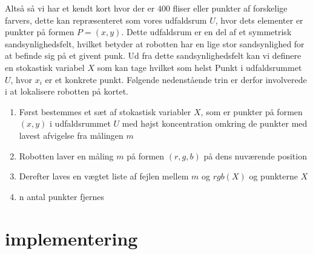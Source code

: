 \documentclass[../../SRP.tex]{subfiles}
\begin{document}

\begin{center}
\end{center}

Altså så vi har et kendt kort hvor der er $400$ fliser eller punkter af forskelige farvers, dette kan repræsenteret som vores udfaldsrum $U$, hvor dets elementer er punkter på formen $P = (x,y)$. Dette udfaldsrum er en del af et symmetrisk sandsynlighedsfelt, hvilket betyder at robotten har en lige stor sandsynlighed for at befinde sig på et givent punk. Ud fra dette sandsynlighedsfelt kan vi definere en stokastisk variabel $X$ som kan tage hvilket som helst Punkt i udfaldsrummet $U$, hvor $x_i$ er et konkrete punkt. Følgende nedenstående trin er derfor involverede i at lokalisere robotten på kortet.

\begin{enumerate}
  \item Først bestemmes et sæt af stokastisk variabler $X$, som er punkter på formen $(x,y)$ i udfaldsrummet $U$ med højst koncentration omkring de punkter med lavest afvigelse fra målingen $m$

  \item Robotten laver en måling $m$ på formen $(r,g,b)$ på dens nuværende position

  \item Derefter laves en vægtet liste af fejlen mellem $m$ og $rgb(X)$ og punkterne $X$

  \item n antal punkter fjernes
\end{enumerate}

\section{implementering}
\end{document}
